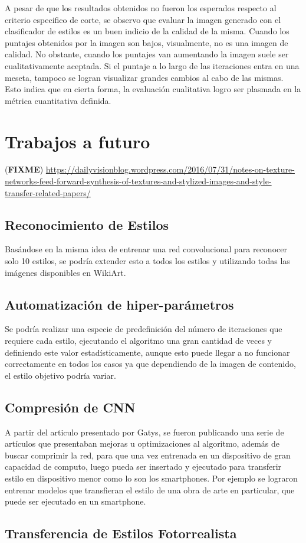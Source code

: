 \documentclass[a4paper,11pt,spanish]{book}
\newcommand*{\FIXME}[1]{{(\textbf{FIXME}) {#1}}}
\begin{document}
    A pesar de que los resultados obtenidos no fueron los esperados respecto al criterio especifico de corte, se observo que evaluar la imagen generado con el clasificador de estilos
    es un buen indicio de la calidad de la misma. Cuando los puntajes obtenidos por la imagen son bajos, visualmente, no es una imagen de calidad. No obstante, cuando los puntajes
    van aumentando la imagen suele ser cualitativamente aceptada. Si el puntaje a lo largo de las iteraciones entra en una meseta, tampoco se logran visualizar grandes cambios al cabo 
    de las mismas. Esto indica que en cierta forma, la evaluación cualitativa logro ser plasmada en la métrica cuantitativa definida.
  
  \section{Trabajos a futuro}
    \FIXME{ \url{https://dailyvisionblog.wordpress.com/2016/07/31/notes-on-texture-networks-feed-forward-synthesis-of-textures-and-stylized-images-and-style-transfer-related-papers/}}
    \subsection{Reconocimiento de Estilos}
      Basándose en la misma idea de entrenar una red convolucional para reconocer solo 10 estilos, se podría extender esto a todos los estilos y utilizando todas las imágenes disponibles
      en WikiArt.
    \subsection{Automatización de hiper-parámetros}
      Se podría realizar una especie de predefinición del número de iteraciones que requiere cada estilo, ejecutando el algoritmo una gran cantidad de veces y definiendo este valor
      estadísticamente, aunque esto puede llegar a no funcionar correctamente en todos los casos ya que dependiendo de la imagen de contenido, el estilo objetivo podría variar.
    \subsection{Compresión de CNN}
      A partir del articulo presentado por Gatys, se fueron publicando una serie de artículos que presentaban mejoras u optimizaciones al algoritmo, además de buscar comprimir la red,
      para que una vez entrenada en un dispositivo de gran capacidad de computo, luego pueda ser insertado y ejecutado para transferir estilo en dispositivo menor como lo son los smartphones.
      Por ejemplo se lograron entrenar modelos que transfieran el estilo de una obra de arte en particular, que puede ser ejecutado en un smartphone.
    \subsection{Transferencia de Estilos Fotorrealista}
      \cite{luan2017deep}

\printindex

\end{document}
